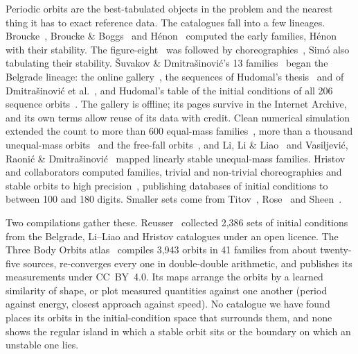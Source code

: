 \documentclass[11pt,a4paper]{article}
\begin{document}
Periodic orbits are the best-tabulated objects in the problem and the nearest thing it has to
exact reference data.  The catalogues fall into a few lineages.  Broucke~\cite{broucke1975},
Broucke \& Boggs~\cite{broucke1975b} and H\'{e}non~\cite{henon1976} computed the early families,
H\'{e}non with their stability.  The figure-eight~\cite{moore1993,chenciner2000} was followed by
choreographies~\cite{moore2006,simo2002}, Sim\'{o} also tabulating their stability.  \v{S}uvakov \&
Dmitra\v{s}inovi\'{c}'s 13 families~\cite{suvakov2013} began the Belgrade lineage: the online
gallery~\cite{threebodygallery}, the sequences of Hudomal's thesis~\cite{hudomal2015} and of
Dmitra\v{s}inovi\'{c} et al.~\cite{dmitrasinovic2018}, and Hudomal's table of the initial conditions
of all 206 sequence orbits~\cite{hudomal2019}.  The gallery is offline; its pages survive in the
Internet Archive, and its own terms allow reuse of its data with credit.  Clean numerical
simulation extended the count to more than 600 equal-mass families~\cite{li2017}, more than a
thousand unequal-mass orbits~\cite{lijingliao2018} and the free-fall orbits~\cite{li2018}, and
Li, Li \& Liao~\cite{lili2020} and Vasiljevi\'{c}, Raoni\'{c} \&
Dmitra\v{s}inovi\'{c}~\cite{vasiljevic2023} mapped linearly stable unequal-mass families.  Hristov
and collaborators computed families, trivial and non-trivial choreographies and stable orbits to
high precision~\cite{hristov2022,hristov2023,hristov2024nc,hristov2026,hristov2024}, publishing
databases of initial conditions to between 100 and 180 digits.  Smaller sets come from Titov~\cite{titov2012},
Rose~\cite{rose2016} and Sheen~\cite{sheen2016}.

Two compilations gather these.  Reusser~\cite{reusser2025} collected 2,386 sets of initial conditions
from the Belgrade, Li--Liao and Hristov catalogues under an open licence.  The Three Body Orbits
atlas~\cite{tbo2026} compiles 3,943 orbits in 41 families from about twenty-five sources,
re-converges every one in double-double arithmetic, and publishes its measurements under CC~BY~4.0.
Its maps arrange the orbits by a learned similarity of shape, or plot measured quantities against
one another (period against energy, closest approach against speed).  No catalogue we have found
places its orbits in the initial-condition space that surrounds them, and none shows the regular
island in which a stable orbit sits or the boundary on which an unstable one lies.
\end{document}
